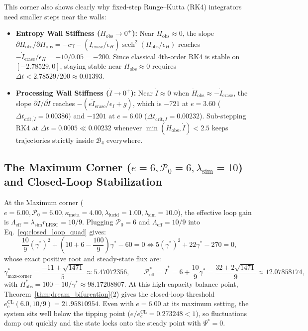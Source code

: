 \documentclass[11pt,a4paper]{article}
\theoremstyle{definition}
\begin{document}
This corner also shows clearly why fixed-step Runge--Kutta (RK4) integrators need smaller steps near the walls:
\begin{itemize}
  \item \textbf{Entropy Wall Stiffness ($H_{\mathrm{obs}} \to 0^+$):} Near $H_{\mathrm{obs}} \approx 0$, the slope $\partial\dot{H}_{\mathrm{obs}}/\partial H_{\mathrm{obs}} = -c\gamma - (\dot{I}_{\mathrm{erase}}/\epsilon_H)\operatorname{sech}^2(H_{\mathrm{obs}}/\epsilon_H)$ reaches $-\dot{I}_{\mathrm{erase}}/\epsilon_H = -10/0.05 = -200$. Since classical 4th-order RK4 is stable on $[-2.78529, 0]$, staying stable near $H_{\mathrm{obs}} \approx 0$ requires $\Delta t < 2.78529/200 \approx 0.01393$.
  \item \textbf{Processing Wall Stiffness ($\dot{I} \to 0^+$):} Near $\dot{I} \approx 0$ when $\dot{H}_{\mathrm{obs}} \approx -\dot{I}_{\mathrm{erase}}$, the slope $\partial\ddot{I}/\partial\dot{I}$ reaches $-(e\dot{I}_{\mathrm{erase}}/\epsilon_I + g)$, which is $-721$ at $e = 3.60$ ($\Delta t_{\mathrm{crit},\dot{I}} = 0.00386$) and $-1201$ at $e = 6.00$ ($\Delta t_{\mathrm{crit},\dot{I}} = 0.00232$). Sub-stepping RK4 at $\Delta t = 0.0005 \ll 0.00232$ whenever $\min(H_{\mathrm{obs}}, \dot{I}) < 2.5$ keeps trajectories strictly inside $\mathcal{B}_4$ everywhere.
\end{itemize}

\subsection{The Maximum Corner \texorpdfstring{($e=6, \mathcal{P}_0=6, \lambda_{\mathrm{sim}}=10$)}{(e=6, P0=6, lam\_sim=10)} and Closed-Loop Stabilization}

At the Maximum corner ($e=6.00, \mathcal{P}_0=6.00, \kappa_{\mathrm{meta}}=4.00, \lambda_{\mathrm{lucid}}=1.00, \lambda_{\mathrm{sim}}=10.0$), the effective loop gain is $\Lambda_{\mathrm{eff}} = \lambda_{\mathrm{sim}}r_{\mathrm{LRSC}} = 10/9$. Plugging $\mathcal{P}_0 = 6$ and $\Lambda_{\mathrm{eff}} = 10/9$ into Eq.~\eqref{eq:closed_loop_quad} gives:
\begin{equation}
\frac{10}{9}(\gamma^*)^2 + \left(10 + 6 - \frac{100}{9}\right)\gamma^* - 60 = 0 \iff 5(\gamma^*)^2 + 22\gamma^* - 270 = 0,
\end{equation}
whose exact positive root and steady-state flux are:
\begin{equation}
\gamma_{\max\text{-corner}}^* = \frac{-11 + \sqrt{1471}}{5} \approx 5.47072356, \qquad \mathcal{P}_{\mathrm{eff}}^* = \dot{I}^* = 6 + \frac{10}{9}\gamma^* = \frac{32 + 2\sqrt{1471}}{9} \approx 12.07858174,
\end{equation}
with $H_{\mathrm{obs}}^* = 100 - 10/\gamma^* \approx 98.17208807$. At this high-capacity balance point, Theorem~\ref{thm:dream_bifurcation}(2) gives the closed-loop threshold $e_c^{\mathrm{CL}}(6.0, 10/9) = 21.95810954$. Even with $e = 6.00$ at its maximum setting, the system sits well below the tipping point ($e/e_c^{\mathrm{CL}} = 0.273248 < 1$), so fluctuations damp out quickly and the state locks onto the steady point with $\Psi^* = 0$.
\end{document}
